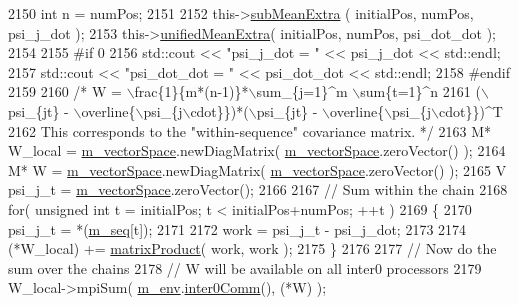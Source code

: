 \begin{DoxyCode}
2150       \textcolor{keywordtype}{int} n = numPos;
2151   
2152       this->\hyperlink{class_q_u_e_s_o_1_1_sequence_of_vectors_a422147ff61e955c29f62447bf0b4d29c}{subMeanExtra}    ( initialPos, numPos, psi\_j\_dot   );
2153       this->\hyperlink{class_q_u_e_s_o_1_1_sequence_of_vectors_aba06456dee4124f8a3b9de07e0ce2163}{unifiedMeanExtra}( initialPos, numPos, psi\_dot\_dot );
2154 
2155 \textcolor{preprocessor}{#if 0}
2156 \textcolor{preprocessor}{}      std::cout << \textcolor{stringliteral}{"psi\_j\_dot = "} << psi\_j\_dot << std::endl;
2157       std::cout << \textcolor{stringliteral}{"psi\_dot\_dot = "} << psi\_dot\_dot << std::endl;
2158 \textcolor{preprocessor}{#endif}
2159 \textcolor{preprocessor}{}
2160       \textcolor{comment}{/* W = \(\backslash\)frac\{1\}\{m*(n-1)\}*\(\backslash\)sum\_\{j=1\}^m \(\backslash\)sum\{t=1\}^n }
2161 \textcolor{comment}{   (\(\backslash\)psi\_\{jt\} - \(\backslash\)overline\{\(\backslash\)psi\_\{j\(\backslash\)cdot\}\})*(\(\backslash\)psi\_\{jt\} - \(\backslash\)overline\{\(\backslash\)psi\_\{j\(\backslash\)cdot\}\})^T}
2162 \textcolor{comment}{   This corresponds to the "within-sequence" covariance matrix. */}
2163       M* W\_local = \hyperlink{class_q_u_e_s_o_1_1_base_vector_sequence_a4bd171e39ed050ff105c808336f35198}{m\_vectorSpace}.newDiagMatrix( \hyperlink{class_q_u_e_s_o_1_1_base_vector_sequence_a4bd171e39ed050ff105c808336f35198}{m\_vectorSpace}.zeroVector() );
2164       M* W = \hyperlink{class_q_u_e_s_o_1_1_base_vector_sequence_a4bd171e39ed050ff105c808336f35198}{m\_vectorSpace}.newDiagMatrix( \hyperlink{class_q_u_e_s_o_1_1_base_vector_sequence_a4bd171e39ed050ff105c808336f35198}{m\_vectorSpace}.zeroVector() );
2165       V  psi\_j\_t = \hyperlink{class_q_u_e_s_o_1_1_base_vector_sequence_a4bd171e39ed050ff105c808336f35198}{m\_vectorSpace}.zeroVector();
2166 
2167       \textcolor{comment}{// Sum within the chain}
2168       \textcolor{keywordflow}{for}( \textcolor{keywordtype}{unsigned} \textcolor{keywordtype}{int} t = initialPos; t < initialPos+numPos; ++t )
2169   \{
2170     psi\_j\_t = *(\hyperlink{class_q_u_e_s_o_1_1_sequence_of_vectors_ae83e7c53439265667809256d0d302e5b}{m\_seq}[t]);
2171 
2172     work = psi\_j\_t - psi\_j\_dot;
2173 
2174     (*W\_local) += \hyperlink{namespace_q_u_e_s_o_aea04e232d5d3dd76349a85bb8acf9e17}{matrixProduct}( work, work );
2175   \}
2176 
2177       \textcolor{comment}{// Now do the sum over the chains}
2178       \textcolor{comment}{// W will be available on all inter0 processors}
2179       W\_local->mpiSum( \hyperlink{class_q_u_e_s_o_1_1_base_vector_sequence_a8e8824d2a63c5a43bcc6473e3a0491e8}{m\_env}.\hyperlink{class_q_u_e_s_o_1_1_base_environment_a689e4d140c74d495d97eb498714a4b82}{inter0Comm}(), (*W) );

\end{DoxyCode}
